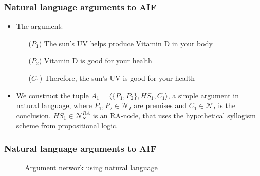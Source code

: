 \documentclass{beamer}
\begin{document}
\begin{frame}
\frametitle{Natural language arguments to AIF}
\begin{itemize}
\item The argument: \pause
  \begin{itemize}
  \item[($P_1$)] The sun's UV helps produce Vitamin D in your body \pause
  \item[($P_2$)] Vitamin D is good for your health \pause
  \item[($C_1$)] Therefore, the sun's UV is good for your health \pause
  \end{itemize}
\item We construct the tuple $A_1 = \langle \lbrace P_1, P_2 \rbrace, HS_1, C_1\rangle$, a simple argument in natural language, where $P_1, P_2 \in \mathcal{N}_I$ are premises and $C_1 \in \mathcal{N}_I$ is the conclusion. $HS_1 \in \mathcal{N}_S^{RA}$ is an RA-node, that uses the hypothetical syllogism scheme from propositional logic.
\end{itemize}
\end{frame}


\begin{frame}
\frametitle{Natural language arguments to AIF}
\begin{figure}
\caption{Argument network using natural language} \label{argnet}
\end{figure}
\end{frame}
\end{document}
